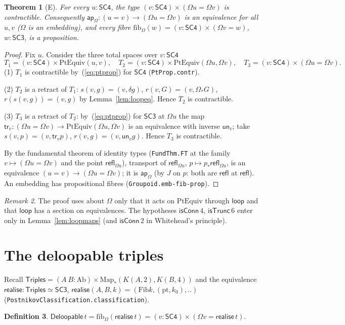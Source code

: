 \documentclass[11pt]{amsart}
\newtheorem{theorem}{Theorem}
\theoremstyle{definition}
\newtheorem{definition}[theorem]{Definition}
\theoremstyle{remark}
\newtheorem{remark}[theorem]{Remark}
\newcommand{\Om}{\Omega}
\newcommand{\code}[1]{\texttt{#1}}
\newcommand{\cT}{\mathsf{isTrunc}}
\newcommand{\cC}{\mathsf{isConn}}
\newcommand{\refl}{\mathsf{refl}}
\newcommand{\ap}{\mathsf{ap}}
\newcommand{\Fib}{\mathrm{Fib}}
\newcommand{\fib}{\mathrm{fib}}
\newcommand{\Ab}{\mathrm{Ab}}
\newcommand{\SCt}{\mathsf{SC3}}
\newcommand{\SCf}{\mathsf{SC4}}
\newcommand{\Tri}{\mathsf{Triples}}
\newcommand{\Del}{\mathsf{Deloopable}}
\newcommand{\real}{\mathsf{realise}}
\newcommand{\Map}{\mathrm{Map}_*}
\newcommand{\PtEq}{\mathrm{PtEquiv}}
\newcommand{\lp}{\mathsf{loop}}
\begin{document}
\begin{theorem}[E]\label{thm:E}
For every $u:\SCf$, the type $(v:\SCf)\times(\Om u=\Om v)$ is contractible.
Consequently $\ap_\Om:(u=v)\to(\Om u=\Om v)$ is an equivalence for all $u,v$
($\Om$ is an embedding), and every fibre $\fib_\Om(w)=(v:\SCf)\times(\Om v=w)$,
$w:\SCt$, is a proposition.
\end{theorem}
\begin{proof}
Fix $u$. Consider the three total spaces over $v:\SCf$
\[
  T_1=(v:\SCf)\times\PtEq(u,v),\quad
  T_2=(v:\SCf)\times\PtEq(\Om u,\Om v),\quad
  T_3=(v:\SCf)\times(\Om u=\Om v).
\]
(1) $T_1$ is contractible by~(\ref{eq:ptprop}) for $\SCf$
(\code{PtProp.contr}).

(2) $T_2$ is a retract of $T_1$: $s(v,g)=(v,\delta g)$, $r(v,G)=(v,\Om_*G)$,
$r(s(v,g))=(v,g)$ by Lemma~\ref{lem:loopeq}. Hence $T_2$ is contractible.

(3) $T_3$ is a retract of $T_2$: by~(\ref{eq:ptprop}) for $\SCt$ at $\Om u$ the
map $\mathsf{tr}_v:(\Om u=\Om v)\to\PtEq(\Om u,\Om v)$ is an equivalence with
inverse $\mathsf{un}_v$; take $s(v,p)=(v,\mathsf{tr}_v p)$, $r(v,g)=(v,\mathsf{un}_v g)$.
Hence $T_3$ is contractible.

By the fundamental theorem of identity types (\code{FundThm.FT} at the family
$v\mapsto(\Om u=\Om v)$ and the point $\refl_{\Om u}$), transport of
$\refl_{\Om u}$, $p\mapsto p_*\refl_{\Om u}$, is an equivalence
$(u=v)\to(\Om u=\Om v)$; it is $\ap_\Om$ (by $J$ on $p$: both are $\refl$ at
$\refl$). An embedding has propositional fibres (\code{Groupoid.emb-fib-prop}).
\end{proof}

\begin{remark}
The proof uses about $\Om$ only that it acts on $\PtEq$ through $\lp$ and that
$\lp$ has a section on equivalences. The hypotheses $\cC\,4$, $\cT\,6$ enter
only in Lemma~\ref{lem:loopmaps} (and $\cC\,2$ in Whitehead's principle).
\end{remark}

\section{The deloopable triples}

Recall $\Tri=(A\ B:\Ab)\times\Map(K(A,2),K(B,4))$ and the equivalence
$\real:\Tri\simeq\SCt$, $\real(A,B,k)=(\Fib k,(\mathrm{pt},k_0),..)$
(\code{PostnikovClassification.classification}).

\begin{definition}
$\Del\,t=\fib_\Om(\real\,t)=(v:\SCf)\times(\Om v=\real\,t)$.
\end{definition}
\end{document}
